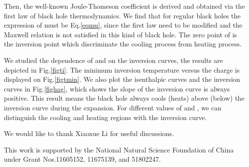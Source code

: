 \documentclass[aps,11pt]{revtex4}
\begin{document}
Then, the well-known Joule-Thomeson coefficient  is derived and obtained via the first law of black hole thermodynamics. We find that for regular black holes the expression of  must be Eq.\ref{eqmu}, since the first law need to be modified and the Maxwell relation is not satisfied in this kind of black hole.
The zero point of  is the inversion point which discriminate the cooling process from heating process.

We studied the dependence of  and  on the inversion curves, the results are depicted in Fig.\ref{figti}.  The minimum inversion temperature versus the charge  is displayed on Fig.\ref{figtmin}. We also plot the isenthalpic curves and the inversion curves in Fig.\ref{fighag}, which shows the slope of the inversion curve is always positive. This result means the black hole always cools (heats) above (below) the inversion curve during the expansion. For different values of  and , we can distinguish the cooling and heating regions with the inversion curve.

We would like to thank Xiaoxue Li for useful discussions.

This work is supported by the National Natural Science Foundation of China under Grant Nos.11605152, 11675139, and 51802247.
\end{document}
